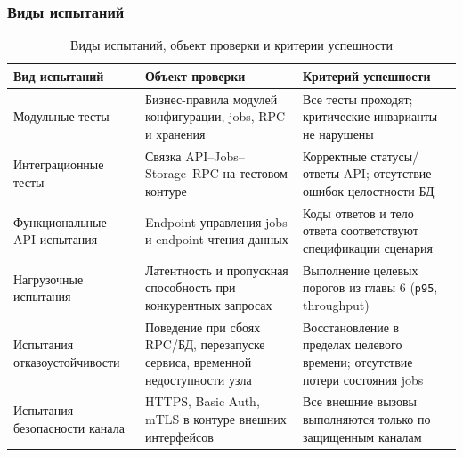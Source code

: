 ﻿\documentclass[14pt,a4paper]{extarticle}
\begin{document}
\subsubsection{Виды испытаний}
\begin{table}[H]
\centering
\begin{tabular}{p{} p{} p{}}
\toprule
Вид испытаний & Объект проверки & Критерий успешности \\
\midrule
Модульные тесты & Бизнес-правила модулей конфигурации, jobs, RPC и хранения & Все тесты проходят; критические инварианты не нарушены \\
\midrule
Интеграционные тесты & Связка API--Jobs--Storage--RPC на тестовом контуре & Корректные статусы/ответы API; отсутствие ошибок целостности БД \\
\midrule
Функциональные API-испытания & Endpoint управления jobs и endpoint чтения данных & Коды ответов и тело ответа соответствуют спецификации сценария \\
\midrule
Нагрузочные испытания & Латентность и пропускная способность при конкурентных запросах & Выполнение целевых порогов из главы 6 (\texttt{p95}, throughput) \\
\midrule
Испытания отказоустойчивости & Поведение при сбоях RPC/БД, перезапуске сервиса, временной недоступности узла & Восстановление в пределах целевого времени; отсутствие потери состояния jobs \\
\midrule
Испытания безопасности канала & HTTPS, Basic Auth, mTLS в контуре внешних интерфейсов & Все внешние вызовы выполняются только по защищенным каналам \\
\bottomrule
\end{tabular}
\caption{Виды испытаний, объект проверки и критерии успешности}
\end{table}
\end{document}

